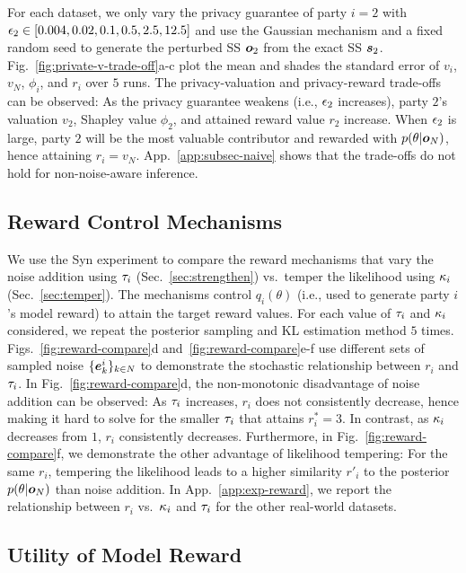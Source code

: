 \documentclass{article}
\theoremstyle{plain}
\theoremstyle{definition}
\theoremstyle{remark}
\begin{document}
For each dataset, we only vary the privacy guarantee of party $i=2$ with ${\epsilon}_2 \in [0.004,0.02,0.1,0.5,2.5,12.5]$ and use the Gaussian mechanism and a fixed random seed to generate the perturbed SS ${\bm{o}}_2$ from the exact SS ${\bm{s}}_2$.
Fig.~\ref{fig:private-v-trade-off}a-c plot the mean and shades the standard error of $v_i$, $v_N$, $\phi_i$, and  $r_i$ over $5$ runs. 
The privacy-valuation and privacy-reward trade-offs 
can be observed:
As the privacy guarantee weakens (i.e., ${\epsilon}_2$ increases), party $2$'s valuation $v_2$, Shapley value $\phi_2$, and attained reward value $r_2$ increase. When ${\epsilon}_2$ is large, party $2$ will be the most valuable contributor and rewarded with $p(\theta|{\bm{o}}_N)$, hence attaining $r_i = v_N$.
App.~\ref{app:subsec-naive} shows that the trade-offs do not hold for non-noise-aware inference.


\subsection{Reward Control Mechanisms}\label{subsec:exp-control}

We use the Syn experiment to compare the reward mechanisms that vary the noise addition using ${\tau_i}$ (Sec.~\ref{sec:strengthen}) vs.~temper the likelihood using ${\kappa_i}$ (Sec.~\ref{sec:temper}). The mechanisms control $q_i(\theta)$ (i.e., used to generate party $i$'s model reward) to attain the target reward values.
For each value of ${\tau_i}$ and ${\kappa_i}$ considered, we repeat the posterior sampling and KL estimation method $5$ times.
Figs.~\ref{fig:reward-compare}d and~\ref{fig:reward-compare}e-f use different sets of sampled noise $\{{\bm{e}}_k^i\}_{k \in N}$ to demonstrate the stochastic relationship between $r_i$ and ${\tau_i}$.
In Fig.~\ref{fig:reward-compare}d,  %
the non-monotonic disadvantage of noise addition can be observed: As ${\tau_i}$ increases, $r_i$ does not consistently decrease, hence making it hard to solve for the smaller ${\tau_i}$ that attains $r^*_i = 3$.
In contrast, as ${\kappa_i}$ decreases from $1$, $r_i$ consistently decreases. 
Furthermore, in Fig.~\ref{fig:reward-compare}f, we demonstrate 
the other advantage of likelihood tempering: For the same $r_i$, tempering the likelihood leads to a higher similarity $r'_i$ to the posterior $p(\theta | {\bm{o}}_N)$ than noise addition. 
In App.~\ref{app:exp-reward}, we report the relationship between $r_i$ vs.~${\kappa_i}$ and ${\tau_i}$ for the other real-world datasets.%


\subsection{Utility of Model Reward}\label{subsec:exp-utility}%
\end{document}
